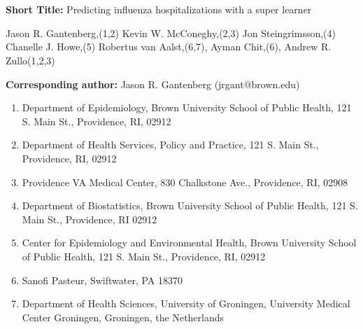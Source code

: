\documentclass[10pt,letterpaper]{article}
\providecommand{\tightlist}{%
  \setlength{\itemsep}{0pt}\setlength{\parskip}{0pt}}
\begin{document}
\vspace*{0.2in}

\begin{flushleft}
{\Large
\textbf{} %
}
\newline
\\
\\
\bigskip
\bigskip
\end{flushleft}


\linenumbers

\textbf{Short Title:} Predicting influenza hospitalizations with a super
learner

Jason R. Gantenberg,(1,2) Kevin W. McConeghy,(2,3) Jon Steingrimsson,(4)
Chanelle J. Howe,(5) Robertus van Aalst,(6,7), Ayman Chit,(6), Andrew R.
Zullo(1,2,3)

\textbf{Corresponding author:} Jason R. Gantenberg (jrgant@brown.edu)

\begin{enumerate}
\def\labelenumi{\arabic{enumi}.}
\tightlist
\item
  Department of Epidemiology, Brown University School of Public Health,
  121 S. Main St., Providence, RI, 02912
\item
  Department of Health Services, Policy and Practice, 121 S. Main St.,
  Providence, RI, 02912
\item
  Providence VA Medical Center, 830 Chalkstone Ave., Providence, RI,
  02908
\item
  Department of Biostatistics, Brown University School of Public Health,
  121 S. Main St., Providence, RI 02912
\item
  Center for Epidemiology and Environmental Health, Brown University
  School of Public Health, 121 S. Main St., Providence, RI, 02912
\item
  Sanofi Pasteur, Swiftwater, PA 18370
\item
  Department of Health Sciences, University of Groningen, University
  Medical Center Groningen, Groningen, the Netherlands
\end{enumerate}
\end{document}
